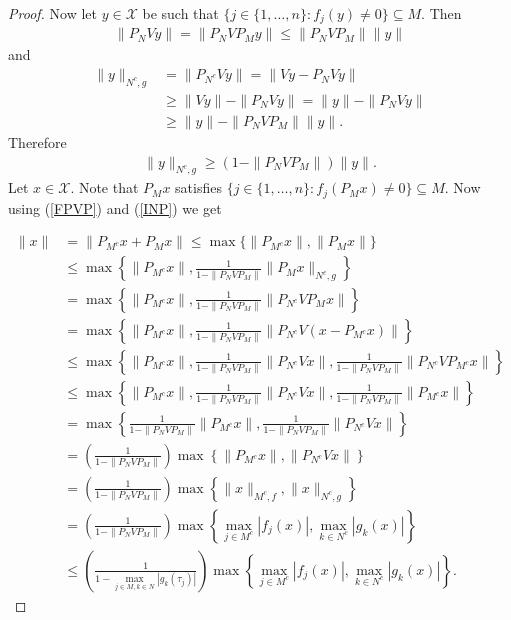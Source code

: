 \documentclass{amsart}
\begin{document}
\begin{proof}
Now let $y \in \mathcal{X}$ be such that $\{j \in \{1, \dots, n\}: f_j(y)\neq 0\} \subseteq M.$
Then 
\begin{align*}
	\|P_NVy\|=\|P_NVP_My\|\leq \|P_NVP_M\|\|y\|
\end{align*}
 and 
\begin{align*}
	\|y\|_{N^c, g}&=\|P_{N^c}Vy\|=\|Vy-P_NVy\|\\
	&\geq \|Vy\|-\|P_NVy\|=\|y\|-\|P_NVy\| \\
	&\geq \|y\|-\|P_NVP_M\|\|y\|.
\end{align*}
Therefore 
\begin{align}\label{INP}
	\|y\|_{N^c, g}\geq (1-\|P_NVP_M\|)\|y\|.
\end{align}
Let $x \in \mathcal{X}$.   Note that $P_Mx$ satisfies $	\{j \in \{1, \dots, n\}: f_j(P_Mx)\neq 0\} \subseteq M.$ Now using (\ref{FPVP}) and (\ref{INP}) we get 

\begin{align*}
	\|x\|&=\|P_{M^c}x+P_Mx\|\leq \max\{\|P_{M^c}x\|, \|P_Mx\|\}\\
	&\leq \max \left\{\|P_{M^c}x\|, \frac{1}{1-\|P_NVP_M\|}	\|P_Mx\|_{N^c, g}\right\} \\
	&= \max \left\{\|P_{M^c}x\|, \frac{1}{1-\|P_NVP_M\|}	\|P_{N^c}VP_Mx\|\right\} \\
	&=\max \left\{\|P_{M^c}x\|, \frac{1}{1-\|P_NVP_M\|}	\|P_{N^c}V(x-P_{M^c}x)\|\right\} \\
	&\leq \max \left\{\|P_{M^c}x\|, \frac{1}{1-\|P_NVP_M\|}	\|P_{N^c}Vx\|, \frac{1}{1-\|P_NVP_M\|}	\|P_{N^c}VP_{M^c}x\|\right\} \\
	&\leq \max \left\{\|P_{M^c}x\|, \frac{1}{1-\|P_NVP_M\|}	\|P_{N^c}Vx\|, \frac{1}{1-\|P_NVP_M\|}	\|P_{M^c}x\|\right\} \\
	&=\max \left\{\frac{1}{1-\|P_NVP_M\|}	\|P_{M^c}x\|, \frac{1}{1-\|P_NVP_M\|}	\|P_{N^c}Vx\|\right\} \\
	&=\left(\frac{1}{1-\|P_NVP_M\|}\right)\max \left\{\|P_{M^c}x\|, \|P_{N^c}Vx\|\right\} \\
	&=\left(\frac{1}{1-\|P_NVP_M\|}\right)\max \left\{\|x\|_{M^c, f}, \|x\|_{N^c, g}\right\} \\
	&= \left(\frac{1}{1-\|P_NVP_M\|}\right)\max\left\{\displaystyle \max_{j \in M^c}|f_j(x)|, \displaystyle \max_{k \in N^c}|g_k(x)|\right\}\\
	&\leq  \left(\frac{1}{1-\displaystyle \max_{j \in M, k \in N}|g_k(\tau_j)|}\right)\max\left\{\displaystyle \max_{j \in M^c}|f_j(x) |, \displaystyle \max_{k \in N^c}|g_k(x)|\right\}.
\end{align*}
\end{proof}
\end{document}
